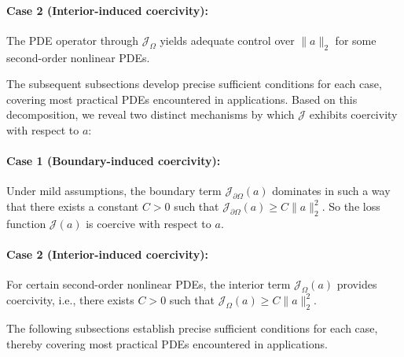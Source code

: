 \documentclass{article}
\begin{document}
\paragraph{Case 2 (Interior-induced coercivity):} The PDE operator through \(\mathcal{J}_{\Omega}\) yields adequate control over $\|a\|_{2}$ for some second-order nonlinear PDEs.

The subsequent subsections develop precise sufficient conditions for each case, covering most practical PDEs encountered in applications. 
\fi
Based on this decomposition, we reveal two distinct mechanisms by which $\mathcal{J}$ exhibits coercivity with respect to $a$:
\vspace{-8pt}

\paragraph{Case 1 (Boundary-induced coercivity):} Under mild assumptions, the boundary term $\mathcal{J}_{\partial\Omega}(a)$ dominates in such a way that there exists a constant $C > 0$ such that
$
    \mathcal{J}_{\partial\Omega}(a) \geq C \|a\|_2^2.
$
So the loss function $\mathcal{J}(a)$ is coercive with respect to $a$.

\vspace{-8pt}
\paragraph{Case 2 (Interior-induced coercivity):} For certain second-order nonlinear PDEs, the interior term $\mathcal{J}_{\Omega}(a)$ provides coercivity, i.e., there exists $C > 0$ such that
$
    \mathcal{J}_{\Omega}(a) \geq C \|a\|_2^2.
$


The following subsections establish precise sufficient conditions for each case, thereby covering most practical PDEs encountered in applications.
\end{document}
